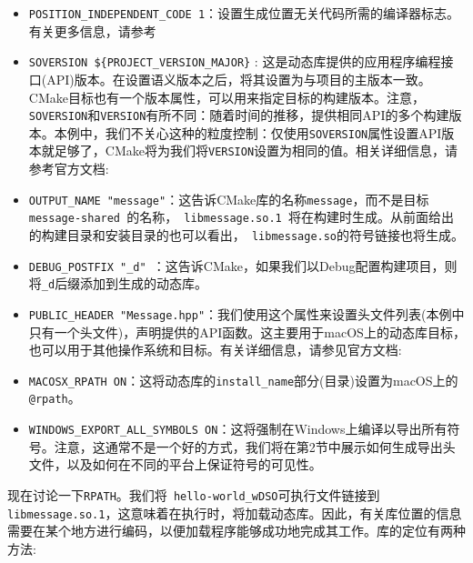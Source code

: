 \begin{itemize}
\item \texttt{POSITION\_INDEPENDENT\_CODE 1}：设置生成位置无关代码所需的编译器标志。有关更多信息，请参考

\item \texttt{SOVERSION \$\{PROJECT\_VERSION\_MAJOR\}} : 这是动态库提供的应用程序编程接口(API)版本。在设置语义版本之后，将其设置为与项目的主版本一致。CMake目标也有一个版本属性，可以用来指定目标的构建版本。注意，\texttt{SOVERSION}和\texttt{VERSION}有所不同：随着时间的推移，提供相同API的多个构建版本。本例中，我们不关心这种的粒度控制：仅使用\texttt{SOVERSION}属性设置API版本就足够了，CMake将为我们将\texttt{VERSION}设置为相同的值。相关详细信息，请参考官方文档:

\item \texttt{OUTPUT\_NAME "message"}：这告诉CMake库的名称\texttt{message}，而不是目标\texttt{ message-shared }的名称，\texttt{ libmessage.so.1 }将在构建时生成。从前面给出的构建目录和安装目录的也可以看出，\texttt{ libmessage.so}的符号链接也将生成。

\item \texttt{DEBUG\_POSTFIX "\_d" }：这告诉CMake，如果我们以Debug配置构建项目，则将\texttt{\_d}后缀添加到生成的动态库。

\item \texttt{PUBLIC\_HEADER "Message.hpp"}：我们使用这个属性来设置头文件列表(本例中只有一个头文件)，声明提供的API函数。这主要用于macOS上的动态库目标，也可以用于其他操作系统和目标。有关详细信息，请参见官方文档:

\item \texttt{MACOSX\_RPATH ON}：这将动态库的\texttt{install\_name}部分(目录)设置为macOS上的\texttt{@rpath}。

\item \texttt{WINDOWS\_EXPORT\_ALL\_SYMBOLS ON}：这将强制在Windows上编译以导出所有符号。注意，这通常不是一个好的方式，我们将在第2节中展示如何生成导出头文件，以及如何在不同的平台上保证符号的可见性。

\end{itemize}

现在讨论一下\texttt{RPATH}。我们将\texttt{ hello-world\_wDSO}可执行文件链接到\texttt{libmessage.so.1}，这意味着在执行时，将加载动态库。因此，有关库位置的信息需要在某个地方进行编码，以便加载程序能够成功地完成其工作。库的定位有两种方法:

